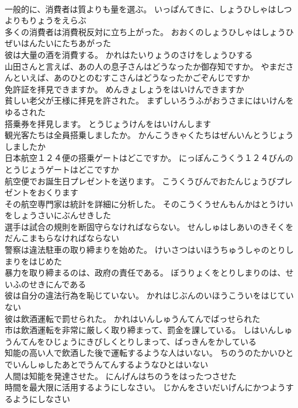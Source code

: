 \documentclass[8pt]{extreport}
\begin{document}
\begin{CJK}{UTF8}{min}
\\	一般的に、消費者は質よりも量を選ぶ。	いっぱんてきに、しょうひしゃはしつよりもりょうをえらぶ 
\\	多くの消費者は消費税反対に立ち上がった。	おおくのしょうひしゃはしょうひぜいはんたいにたちあがった 
\\	彼は大量の酒を消費する。	かれはたいりょうのさけをしょうひする 
\\	山田さんと言えば、あの人の息子さんはどうなったか御存知ですか。	やまださんといえば、あのひとのむすこさんはどうなったかごぞんじですか 
\\	免許証を拝見できますか。	めんきょしょうをはいけんできますか 
\\	貧しい老父が王様に拝見を許された。	まずしいろうふがおうさまにはいけんをゆるされた 
\\	搭乗券を拝見します。	とうじょうけんをはいけんします 
\\	観光客たちは全員搭乗しましたか。	かんこうきゃくたちはぜんいんとうじょうしましたか 
\\	日本航空１２４便の搭乗ゲートはどこですか。	にっぽんこうくう１２４びんのとうじょうゲートはどこですか 
\\	航空便でお誕生日プレゼントを送ります。	こうくうびんでおたんじょうびプレゼントをおくります 
\\	その航空専門家は統計を詳細に分析した。	そのこうくうせんもんかはとうけいをしょうさいにぶんせきした 
\\	選手は試合の規則を断固守らなければならない。	せんしゅはしあいのきそくをだんこまもらなければならない 
\\	警察は違法駐車の取り締まりを始めた。	けいさつはいほうちゅうしゃのとりしまりをはじめた 
\\	暴力を取り締まるのは、政府の責任である。	ぼうりょくをとりしまりのは、せいふのせきにんである 
\\	彼は自分の違法行為を恥じていない。	かれはじぶんのいほうこういをはじていない 
\\	彼は飲酒運転で罰せられた。	かれはいんしゅうんてんでばっせられた 
\\	市は飲酒運転を非常に厳しく取り締まって、罰金を課している。	しはいんしゅうんてんをひじょうにきびしくとりしまって、ばっきんをかしている 
\\	知能の高い人で飲酒した後で運転するような人はいない。	ちのうのたかいひとでいんしゅしたあとでうんてんするようなひとはいない 
\\	人間は知能を発達させた。	にんげんはちのうをはったつさせた 
\\	時間を最大限に活用するようにしなさい。	じかんをさいだいげんにかつようするようにしなさい 

\end{CJK}
\end{document}
